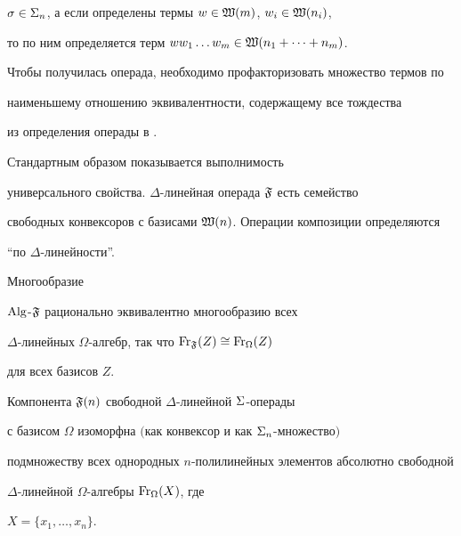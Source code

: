 $\sigma\in \Sigma_n$, а если определены термы $w\in \frak W(m)$, $w_i \in \frak W(n_i)$,


то по ним определяется терм $ww_1\dotsc w_m\in \frak W(n_1+\dotsb+n_m)$.


Чтобы получилась операда, необходимо профакторизовать множество термов по


наименьшему отношению эквивалентности, содержащему все тождества


из определения операды в \cite{T0}.


Стандартным образом показывается выполнимость


универсального свойства. $\Delta$-линейная операда $\frak F$ есть семейство


свободных конвексоров с базисами $\frak W(n)$. Операции композиции определяются


``по $\Delta$-линейности''.








\begin{thm}


Многообразие


$\operatorname{Alg}$-$\frak F$ рационально эквивалентно многообразию всех


$\Delta$-линейных $\Omega$-алгебр, так что $\operatorname{Fr}_{\frak F}(Z)\cong \operatorname{Fr}_{\Omega}(Z)$


для всех базисов $Z$.


Компонента $\frak F (n)$ свободной $\Delta$-линейной $\Sigma$-операды


с базисом $\Omega$ изоморфна $($как конвексор и как $\Sigma_n$-множество$)$


подмножеству всех однородных $n$-полилинейных элементов абсолютно свободной


$\Delta$-линейной $\Omega$-алгебры $\operatorname{Fr}_{\Omega}(X)$, где 


$X=\{x_1,\dotsc, x_n\}$.


\end{thm}





